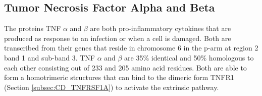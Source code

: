 \subsection{Tumor Necrosis Factor Alpha and Beta}
The proteins TNF $\alpha$ and $\beta$ are both pro-inflammatory cytokines that are produced as response to an infection or when a cell is damaged. Both are transcribed from their genes that reside in chromosome 6 in the p-arm at region 2 band 1 and sub-band 3. TNF $\alpha$ and $\beta$ are 35\% identical and 50\% homologous to each other consisting out of 233 and 205 amino acid residues. Both are able to form a homotrimeric structures that can bind to the dimeric form TNFR1 (Section \ref{subsec:CD_TNFRSF1A}) to activate the extrinsic pathway\cite{}. 
\label{subsec:CD_TNF_A_B}